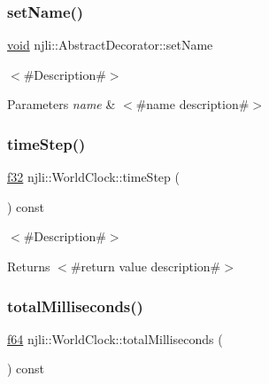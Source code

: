 \subsubsection{\texorpdfstring{set\+Name()}{setName()}}
{\footnotesize\ttfamily \mbox{\hyperlink{_thread_8h_af1e856da2e658414cb2456cb6f7ebc66}{void}} njli\+::\+Abstract\+Decorator\+::set\+Name}

$<$\#\+Description\#$>$


\begin{DoxyParams}{Parameters}
{\em name} & $<$\#name description\#$>$ \\
\hline
\end{DoxyParams}
\mbox{\label{classnjli_1_1_world_clock_a756caa9141b7e68da86d65050552102d}} 
\subsubsection{\texorpdfstring{time\+Step()}{timeStep()}}
{\footnotesize\ttfamily \mbox{\hyperlink{_util_8h_a5f6906312a689f27d70e9d086649d3fd}{f32}} njli\+::\+World\+Clock\+::time\+Step (\begin{DoxyParamCaption}{ }\end{DoxyParamCaption}) const}

$<$\#\+Description\#$>$

\begin{DoxyReturn}{Returns}
$<$\#return value description\#$>$ 
\end{DoxyReturn}
\mbox{\label{classnjli_1_1_world_clock_a0594a3ed72d610082cc4ad00bb2d0e42}} 
\subsubsection{\texorpdfstring{total\+Milliseconds()}{totalMilliseconds()}}
{\footnotesize\ttfamily \mbox{\hyperlink{_util_8h_a94dab5770726ccbef8c7d026cfbdf8e5}{f64}} njli\+::\+World\+Clock\+::total\+Milliseconds (\begin{DoxyParamCaption}{ }\end{DoxyParamCaption}) const}

